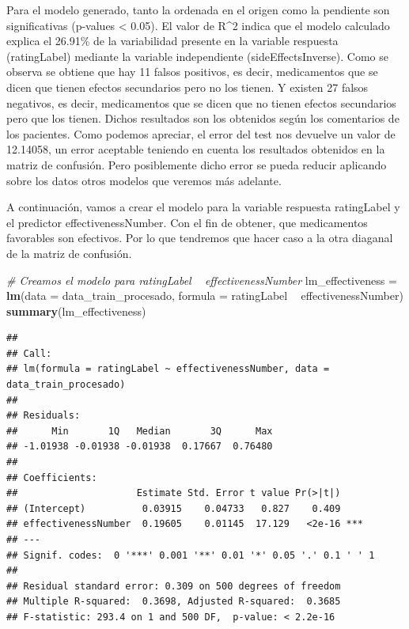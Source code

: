 \documentclass[spanish,]{article}
\newenvironment{Shaded}{\begin{snugshade}}{\end{snugshade}}
\newcommand{\KeywordTok}[1]{\textcolor[rgb]{0.13,0.29,0.53}{\textbf{#1}}}
\newcommand{\DataTypeTok}[1]{\textcolor[rgb]{0.13,0.29,0.53}{#1}}
\newcommand{\StringTok}[1]{\textcolor[rgb]{0.31,0.60,0.02}{#1}}
\newcommand{\CommentTok}[1]{\textcolor[rgb]{0.56,0.35,0.01}{\textit{#1}}}
\newcommand{\OperatorTok}[1]{\textcolor[rgb]{0.81,0.36,0.00}{\textbf{#1}}}
\newcommand{\NormalTok}[1]{#1}
\begin{document}
Para el modelo generado, tanto la ordenada en el origen como la
pendiente son significativas (p-values \textless{} 0.05). El valor de
R\^{}2 indica que el modelo calculado explica el 26.91\% de la
variabilidad presente en la variable respuesta (ratingLabel) mediante la
variable independiente (sideEffectsInverse). Como se observa se obtiene
que hay 11 falsos positivos, es decir, medicamentos que se dicen que
tienen efectos secundarios pero no los tienen. Y existen 27 falsos
negativos, es decir, medicamentos que se dicen que no tienen efectos
secundarios pero que los tienen. Dichos resultados son los obtenidos
según los comentarios de los pacientes. Como podemos apreciar, el error
del test nos devuelve un valor de 12.14058, un error aceptable teniendo
en cuenta los resultados obtenidos en la matriz de confusión. Pero
posiblemente dicho error se pueda reducir aplicando sobre los datos
otros modelos que veremos más adelante.

A continuación, vamos a crear el modelo para la variable respuesta
ratingLabel y el predictor effectivenessNumber. Con el fin de obtener,
que medicamentos favorables son efectivos. Por lo que tendremos que
hacer caso a la otra diaganal de la matriz de confusión.

\begin{Shaded}
\begin{Highlighting}[]
\CommentTok{# Creamos el modelo para ratingLabel ~ effectivenessNumber}
\NormalTok{lm_effectiveness =}\StringTok{ }\KeywordTok{lm}\NormalTok{(}\DataTypeTok{data =}\NormalTok{ data_train_procesado, }\DataTypeTok{formula =}\NormalTok{ ratingLabel }\OperatorTok{~}\StringTok{ }\NormalTok{effectivenessNumber)}
\KeywordTok{summary}\NormalTok{(lm_effectiveness)}
\end{Highlighting}
\end{Shaded}

\begin{verbatim}
## 
## Call:
## lm(formula = ratingLabel ~ effectivenessNumber, data = data_train_procesado)
## 
## Residuals:
##      Min       1Q   Median       3Q      Max 
## -1.01938 -0.01938 -0.01938  0.17667  0.76480 
## 
## Coefficients:
##                     Estimate Std. Error t value Pr(>|t|)    
## (Intercept)          0.03915    0.04733   0.827    0.409    
## effectivenessNumber  0.19605    0.01145  17.129   <2e-16 ***
## ---
## Signif. codes:  0 '***' 0.001 '**' 0.01 '*' 0.05 '.' 0.1 ' ' 1
## 
## Residual standard error: 0.309 on 500 degrees of freedom
## Multiple R-squared:  0.3698, Adjusted R-squared:  0.3685 
## F-statistic: 293.4 on 1 and 500 DF,  p-value: < 2.2e-16
\end{verbatim}
\end{document}
